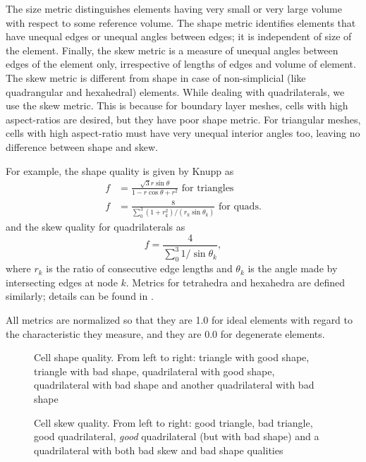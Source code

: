  The size metric distinguishes elements having very small or very large volume with respect to some reference volume. The shape metric identifies elements that have unequal edges or unequal angles between edges; it is independent of size of the element. Finally, the skew metric is a measure of unequal angles between edges of the element only, irrespective of lengths of edges and volume of element. The skew metric is different from shape in case of non-simplicial (like quadrangular and hexahedral) elements. While dealing with quadrilaterals, we use the skew metric. This is because for boundary layer meshes, cells with high aspect-ratios are desired, but they have poor shape metric. For triangular meshes, cells with high aspect-ratio must have very unequal interior angles too, leaving no difference between shape and skew.
 
 For example, the shape quality is given by Knupp as
 \begin{align}
 f &= \frac{\sqrt{3}r\sin\theta}{1-r\cos\theta+r^2} \text{ for triangles} \\
 f &= \frac{8}{\sum_0^3(1+r_k^2)/(r_k\sin\theta_k)} \text{ for quads.}
 \end{align}
 and the skew quality for quadrilaterals as
 \begin{equation}
 f = \frac{4}{\sum_0^3 1/\sin\theta_k},
 \end{equation}
 where $r_k$ is the ratio of consecutive edge lengths and $\theta_k$ is the angle made by intersecting edges at node $k$. Metrics for tetrahedra and hexahedra are defined similarly; details can be found in \cite{qualknupp}.
 
 All metrics are normalized so that they are 1.0 for ideal elements with regard to the characteristic they measure, and they are 0.0 for degenerate elements. 
 
 \begin{figure}
 	\centering
 	\hspace{0.2in}
 	\hspace{0.2in}
 	\caption{Cell shape quality. From left to right: triangle with good shape, triangle with bad shape, quadrilateral with good shape, quadrilateral with bad shape and another quadrilateral with bad shape}
 	\label{fig:shape}
 \end{figure}
 \begin{figure}
 	\centering
 	\hspace{0.2in}
 	\hspace{0.2in}
 	\caption{Cell skew quality. From left to right: good triangle, bad triangle, good quadrilateral, \emph{good} quadrilateral (but with bad shape) and a quadrilateral with both bad skew and bad shape qualities}
 	\label{fig:skew}
 \end{figure}
 
